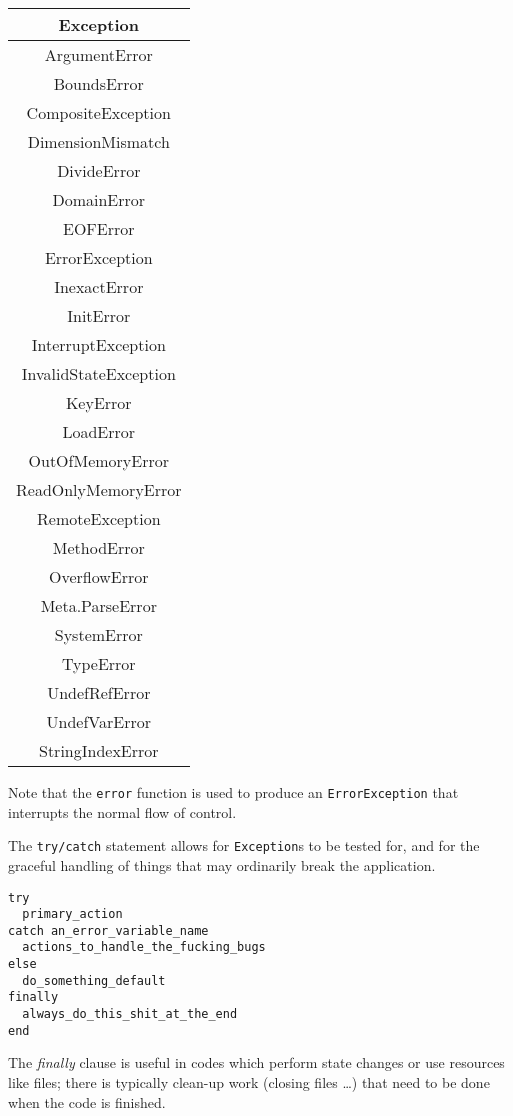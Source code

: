 \documentclass[
]{article}
\begin{document}
\begin{longtable}[]{@{}c@{}}
\toprule\noalign{}
Exception \\
\midrule\noalign{}
\endhead
\bottomrule\noalign{}
\endlastfoot
ArgumentError \\
BoundsError \\
CompositeException \\
DimensionMismatch \\
DivideError \\
DomainError \\
EOFError \\
ErrorException \\
InexactError \\
InitError \\
InterruptException \\
InvalidStateException \\
KeyError \\
LoadError \\
OutOfMemoryError \\
ReadOnlyMemoryError \\
RemoteException \\
MethodError \\
OverflowError \\
Meta.ParseError \\
SystemError \\
TypeError \\
UndefRefError \\
UndefVarError \\
StringIndexError \\
\end{longtable}

Note that the \texttt{error} function is used to produce an
\texttt{ErrorException} that interrupts the normal flow of control.

The \texttt{try/catch} statement allows for \texttt{Exception}s to be
tested for, and for the graceful handling of things that may ordinarily
break the application.

\begin{verbatim}
try
  primary_action
catch an_error_variable_name
  actions_to_handle_the_fucking_bugs
else
  do_something_default
finally
  always_do_this_shit_at_the_end
end
\end{verbatim}

The \emph{finally} clause is useful in codes which perform state changes
or use resources like files; there is typically clean-up work (closing
files \ldots) that need to be done when the code is finished.
\end{document}
